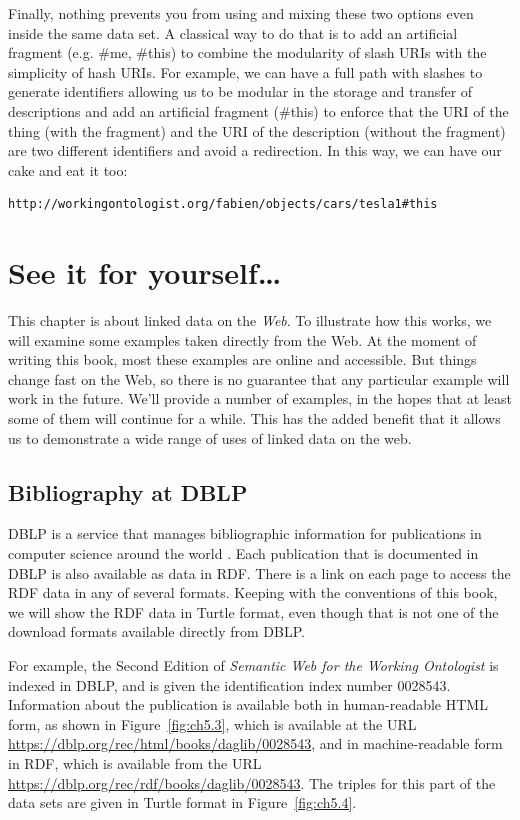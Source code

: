 Finally, nothing prevents you from using and mixing these two options
even inside the same data set. A classical way to do that is to add an
artificial fragment (e.g. \#me, \#this) to combine the modularity of 
slash URIs with the simplicity  of  hash URIs. For example, we can have a full
path with slashes to generate identifiers allowing us to be modular in
the storage and transfer of descriptions and add an artificial fragment
(\#this) to enforce that the URI of the thing (with the fragment) and
the URI of the description (without the fragment) are two different
identifiers and avoid a redirection. In this way, we can have our
cake and eat it too:

\begin{lstlisting}
http://workingontologist.org/fabien/objects/cars/tesla1#this
\end{lstlisting}

\hypertarget{see-it-for-yourself}{%
\section{See it for yourself\ldots{}}\label{see-it-for-yourself}}

This chapter is about linked data on the \emph{Web}.  To illustrate 
how this works, we will examine some examples taken directly from the Web. At
the moment of writing this book, most these examples are online and
accessible.   But things change fast on the Web, so there is no guarantee that 
any particular example will work in the future.   We'll provide a number of examples,
in the hopes that at least some of them will continue for a while.  This has the added benefit 
that it allows us to demonstrate a wide range of uses of linked data on the web. 

\subsection{Bibliography at DBLP}

DBLP is a service that manages bibliographic information for publications
in computer science around the world \cite{DBLP:conf/spire/Ley02}.  Each 
publication that is documented in DBLP is also available as data in RDF. 
There is a link on each page to access the RDF data in any of several 
formats.  Keeping with the conventions of this book, we will show the
RDF data in Turtle format, even though that is not one of the download formats 
available directly from DBLP. 

For example, the Second Edition of \emph{Semantic Web for the Working Ontologist} is 
indexed in DBLP, and is given the identification index number 0028543.  Information about
the publication is available both in human-readable HTML form, as shown in Figure~\ref{fig:ch5.3}, 
which is available at the URL \url{https://dblp.org/rec/html/books/daglib/0028543}, and in machine-readable form
in RDF, which is available from the URL \url{https://dblp.org/rec/rdf/books/daglib/0028543}. 
The triples for this part of the data sets are given in Turtle format in Figure~\ref{fig:ch5.4}.


